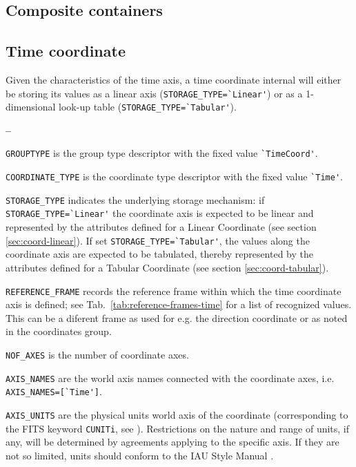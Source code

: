 \documentclass[a4paper,10pt,bibtotoc]{scrreprt}
\begin{document}
\subsection{Composite containers}
\label{sec:composite-containers}

\subsection{Time coordinate}
\label{sec:coord-time}

Given the characteristics of the time axis, a time coordinate internal
will either be storing its values as a linear axis
(\verb|STORAGE_TYPE=`Linear'|) or as a 1-dimensional look-up table
(\verb|STORAGE_TYPE=`Tabular'|).



\begin{list}{\textbf{--}}{}
\item \verb|GROUPTYPE| is the group type descriptor with the fixed
  value \verb|`TimeCoord'|.
\item \verb|COORDINATE_TYPE| is the coordinate type descriptor with
  the fixed value \verb|`Time'|.
\item \verb|STORAGE_TYPE| indicates the underlying storage mechanism: if 
  \verb|STORAGE_TYPE=`Linear'| the coordinate axis is expected to be linear and
  represented by the attributes defined for a Linear Coordinate (see section
  \ref{sec:coord-linear}). If set \verb|STORAGE_TYPE=`Tabular'|, the values along
  the coordinate axis are expected to be tabulated, thereby represented by the
  attributes defined for a Tabular Coordinate (see section
  \ref{sec:coord-tabular}).

\item \verb|REFERENCE_FRAME| records the reference frame within which
  the time coordinate axis is defined; see
  Tab.~\ref{tab:reference-frames-time} for a list of recognized
  values. This can be a diferent frame as used for e.g. the direction
  coordinate or as noted in the coordinates group. 
\item \verb|NOF_AXES| is the number of coordinate axes.
\item \verb|AXIS_NAMES| are the world axis names connected with the
  coordinate axes, i.e. \verb|AXIS_NAMES=[`Time']|.
\item \verb|AXIS_UNITS| are the physical units world axis of the coordinate
  (corresponding to the FITS keyword \verb|CUNITi|, see \cite{fits.paper1}).
  Restrictions on the nature and range of units, if any, will be determined by
  agreements applying to the specific axis. If they are not so limited, units
  should conform to the IAU Style Manual \cite{mcnally.1988}.
\end{list}
\end{document}
